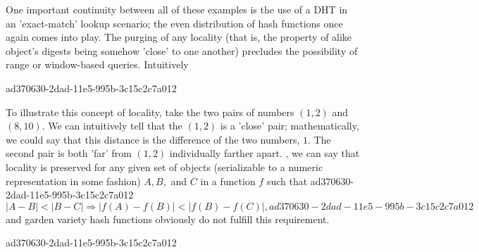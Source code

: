 \documentclass[12pt]{article}
\begin{document}
\par One important continuity between all of these examples is the use of a DHT in an 'exact-match' lookup scenario; the even distribution of hash functions once again comes into play. The purging of any locality (that is, the property of alike object's digests being somehow 'close' to one another) precludes the possibility of range or window-based queries. Intuitively

ad370630-2dad-11e5-995b-3c15c2c7a012\par To illustrate this concept of locality, take the two pairs of numbers $(1,2)$ and $(8,10)$. We can intuitively tell that the $(1,2)$ is a 'close' pair; mathematically, we could say that this distance is the difference of the two numbers, $1$. The second pair is both 'far' from $(1,2)$ individually farther apart. , we can say that locality is preserved for any given set of objects (serializable to a numeric representation in some fashion) $A,B,$ and $C$ in a function $f$ such that
ad370630-2dad-11e5-995b-3c15c2c7a012\begin{equation}
|A-B| < |B-C| \Rightarrow |f(A)-f(B)| < |f(B) - f(C)|,
ad370630-2dad-11e5-995b-3c15c2c7a012\end{equation}
and garden variety hash functions obviously do not fulfill this requirement.

\printbibliography
ad370630-2dad-11e5-995b-3c15c2c7a012
\end{document}
